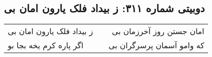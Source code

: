 \begin{center}
\section*{دوبیتی شماره ۳۱۱: ز بیداد فلک یارون امان بی}
\label{sec:311}
\begin{longtable}{l p{0.5cm} r}
ز بیداد فلک یارون امان بی
&&
امان جستن روز آخرزمان بی
\\
اگر پاره کرم یخه بجا بو
&&
که وامو آسمان پرسرگران بی
\\
\end{longtable}
\end{center}
